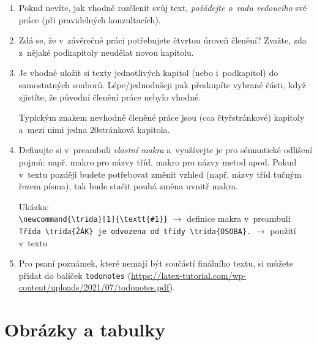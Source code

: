 \begin{enumerate}
\item Pokud nevíte, jak vhodně rozčlenit svůj text, {\em požádejte o~radu vedoucího\/} své práce (při pravidelných konzultacích).
\item Zdá se, že v~závěrečné práci potřebujete čtvrtou úroveň členění? Zvažte, zda z~nějaké podkapitoly neudělat novou kapitolu.
\item Je vhodné uložit si texty jednotlivých kapitol (nebo i~podkapitol) do samostatných souborů. Lépe/jednodušeji pak přeskupíte vybrané části, když zjistíte, že původní členění práce nebylo vhodné. \par Typickým znakem nevhodně členěné práce jsou  (cca čtyřstránkové) kapitoly a~mezi nimi jedna  20stránková kapitola.
\item Definujte si v~preambuli  \textit{vlastní makra} a~využívejte je pro sémantické odlišení pojmů: např. makro pro názvy tříd, makro pro názvy metod apod. Pokud v~textu později budete potřebovat změnit vzhled (např. názvy tříd tučným řezem písma), tak bude stačit pouhá změna uvnitř makra.\par 
Ukázka:\\
\texttt{\textbackslash newcommand\{\textbackslash trida\}[1]\{\textbackslash textt\{\#1\}\}} $\rightarrow$ definice makra v~preambuli\\
\texttt{Třída \textbackslash trida\{ŽÁK\} je odvozena od třídy \textbackslash trida\{OSOBA\}.} $\rightarrow$ použití v~textu
\item Pro psaní poznámek, které nemají být součástí finálního textu, si můžete přidat do  balíček \texttt{todonotes} (\url{https://latex-tutorial.com/wp-content/uploads/2021/07/todonotes.pdf}).

\end{enumerate}

\section{Obrázky a tabulky}\label{sekceObrTab}

